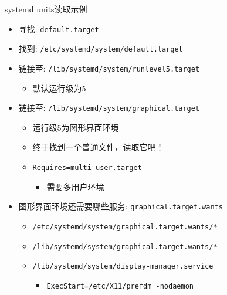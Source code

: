 \documentclass[CJK,xetex]{beamer}
\newcommand{\mydir}[1]{{\color{red} \texttt{#1}}}
\newcommand{\myfile}[1]{{\color{purple} \texttt{#1}}}
\begin{document}
\begin{frame}{systemd units读取示例}
  \begin{itemize}[<+->]
  \item 寻找: \myfile{default.target}
  \item 找到: \myfile{/etc/systemd/system/default.target}
  \item 链接至: \myfile{/lib/systemd/system/runlevel5.target}
    \begin{itemize}
    \item 默认运行级为5
    \end{itemize}
  \item 链接至: \myfile{/lib/systemd/system/graphical.target}
    \begin{itemize}
    \item 运行级5为图形界面环境
    \item 终于找到一个普通文件，读取它吧！
    \item \texttt{Requires=multi-user.target}
      \begin{itemize}
      \item 需要多用户环境
      \end{itemize}
    \end{itemize}
  \item 图形界面环境还需要哪些服务: \mydir{graphical.target.wants}
    \begin{itemize}
    \item \myfile{/etc/systemd/system/graphical.target.wants/*}
    \item \myfile{/lib/systemd/system/graphical.target.wants/*}
    \item \myfile{/lib/systemd/system/display-manager.service}
      \begin{itemize}
      \item \texttt{ExecStart=/etc/X11/prefdm -nodaemon}
      \end{itemize}
    \end{itemize}
  \end{itemize}
\end{frame}
\end{document}
